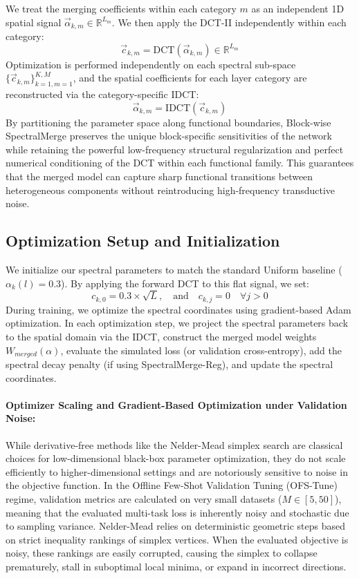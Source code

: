 We treat the merging coefficients within each category $m$ as an independent 1D spatial signal $\vec{\alpha}_{k, m} \in \mathbb{R}^{L_m}$. We then apply the DCT-II independently within each category:
\begin{equation}
    \vec{c}_{k, m} = \text{DCT}(\vec{\alpha}_{k, m}) \in \mathbb{R}^{L_m}
\end{equation}
Optimization is performed independently on each spectral sub-space $\{\vec{c}_{k, m}\}_{k=1, m=1}^{K, M}$, and the spatial coefficients for each layer category are reconstructed via the category-specific IDCT:
\begin{equation}
    \vec{\alpha}_{k, m} = \text{IDCT}(\vec{c}_{k, m})
\end{equation}
By partitioning the parameter space along functional boundaries, Block-wise SpectralMerge preserves the unique block-specific sensitivities of the network while retaining the powerful low-frequency structural regularization and perfect numerical conditioning of the DCT within each functional family. This guarantees that the merged model can capture sharp functional transitions between heterogeneous components without reintroducing high-frequency transductive noise.

\subsection{Optimization Setup and Initialization}
We initialize our spectral parameters to match the standard Uniform baseline ($\alpha_k(l) = 0.3$). By applying the forward DCT to this flat signal, we set:
\begin{equation}
    c_{k,0} = 0.3 \times \sqrt{L}, \quad \text{and} \quad c_{k,j} = 0 \quad \forall j > 0
\end{equation}
During training, we optimize the spectral coordinates using gradient-based Adam optimization. In each optimization step, we project the spectral parameters back to the spatial domain via the IDCT, construct the merged model weights $W_{merged}(\alpha)$, evaluate the simulated loss (or validation cross-entropy), add the spectral decay penalty (if using SpectralMerge-Reg), and update the spectral coordinates.

\paragraph{Optimizer Scaling and Gradient-Based Optimization under Validation Noise:}
While derivative-free methods like the Nelder-Mead simplex search are classical choices for low-dimensional black-box parameter optimization, they do not scale efficiently to higher-dimensional settings and are notoriously sensitive to noise in the objective function. In the Offline Few-Shot Validation Tuning (OFS-Tune) regime, validation metrics are calculated on very small datasets ($M \in [5, 50]$), meaning that the evaluated multi-task loss is inherently noisy and stochastic due to sampling variance. Nelder-Mead relies on deterministic geometric steps based on strict inequality rankings of simplex vertices. When the evaluated objective is noisy, these rankings are easily corrupted, causing the simplex to collapse prematurely, stall in suboptimal local minima, or expand in incorrect directions.

